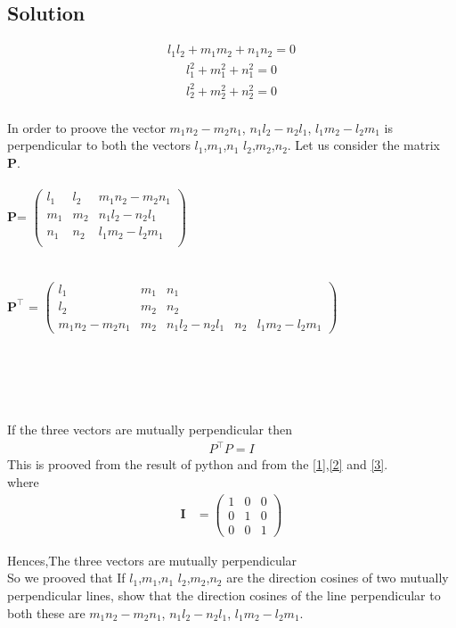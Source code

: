 \documentclass[12pt]{article}
\newcommand{\myvec}[1]{\ensuremath{\begin{pmatrix}#1\end{pmatrix}}}
\let\vec\mathbf
\begin{document}
\begin{enumerate}
\section{Solution}
\begin{align}
 l_1l_2+m_1m_2+n_1n_2=0\label{1}
 \end{align}
 \begin{align}
 l_1^2+m_1^2+n_1^2=0\label{2}
  \end{align}
  \begin{align}
  l_2^2+m_2^2+n_2^2=0\label{3}
  \end{align}
\\
In order to proove the vector  $m_1n_2-m_2n_1$, $n_1l_2-n_2l_1$, $l_1m_2-l_2m_1$ is perpendicular to both the vectors $l_1$,$m_1$,$n_1$  $l_2$,$m_2$,$n_2$. Let us consider the matrix \textbf{P}.
\\
\\
\textbf{P}=
	$\begin{pmatrix}
l_1&l_2&m_1n_2-m_2n_1\\
        m_1&m_2&n_1l_2-n_2l_1\\
        n_1&n_2&l_1m_2-l_2m_1\\
	\end{pmatrix}$
	\\
	\\	
	\\
	$\textbf{P}^{\top}$ =
	$\begin{pmatrix}
l_1&m_1&n_1\\
l_2&m_2&n_2\\
m_1n_2-m_2n_1&m_2&n_1l_2-n_2l_1&n_2&l_1m_2-l_2m_1
	\end{pmatrix}$ 
	\\
	\\
	\\
	\\
	\\
	\\
	If the three vectors are mutually perpendicular then
	\\
	\begin{align}
	P^{\top} P=I
	\end{align}
	This is prooved from the result of python and from the \eqref{1},\eqref{2} and \eqref{3}.\\
where 	
\begin{align}
\vec{I}&=
\myvec{
	         1&0&0\\
	          0&1&0\\
	           0&0&1
	           }
	\end{align}
	
	Hences,The three vectors are mutually perpendicular\\
	So we prooved that If $l_1$,$m_1$,$n_1$  $l_2$,$m_2$,$n_2$ are the direction cosines of two mutually perpendicular lines, show that the direction cosines of the line perpendicular to both these are  $m_1n_2-m_2n_1$, $n_1l_2-n_2l_1$, $l_1m_2-l_2m_1$.
	
	\noindent\fbox{%
    \parbox{\linewidth}{%
   	\url{https://github.com/ahilan22/fwc-2/tree/main/probability/assignment/codes/12-13-4-6.py}
    }%
}

\end{enumerate}							
\end{document}
